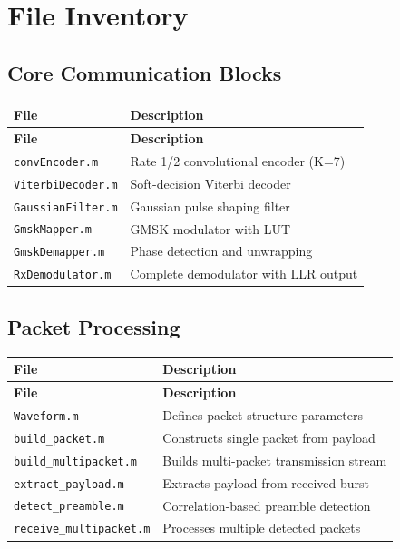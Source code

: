 \documentclass[12pt]{article}
\begin{document}
\section{File Inventory}

\subsection{Core Communication Blocks}
\begin{longtable}{|p{4cm}|p{10cm}|}
\hline
\textbf{File} & \textbf{Description} \\
\hline
\endfirsthead
\hline
\textbf{File} & \textbf{Description} \\
\hline
\endhead
\hline
\endfoot
\hline
\texttt{convEncoder.m} & Rate 1/2 convolutional encoder (K=7) \\
\hline
\texttt{ViterbiDecoder.m} & Soft-decision Viterbi decoder \\
\hline
\texttt{GaussianFilter.m} & Gaussian pulse shaping filter \\
\hline
\texttt{GmskMapper.m} & GMSK modulator with LUT \\
\hline
\texttt{GmskDemapper.m} & Phase detection and unwrapping \\
\hline
\texttt{RxDemodulator.m} & Complete demodulator with LLR output \\
\hline
\end{longtable}

\subsection{Packet Processing}
\begin{longtable}{|p{4cm}|p{10cm}|}
\hline
\textbf{File} & \textbf{Description} \\
\hline
\endfirsthead
\hline
\textbf{File} & \textbf{Description} \\
\hline
\endhead
\hline
\endfoot
\hline
\texttt{Waveform.m} & Defines packet structure parameters \\
\hline
\texttt{build\_packet.m} & Constructs single packet from payload \\
\hline
\texttt{build\_multipacket.m} & Builds multi-packet transmission stream \\
\hline
\texttt{extract\_payload.m} & Extracts payload from received burst \\
\hline
\texttt{detect\_preamble.m} & Correlation-based preamble detection \\
\hline
\texttt{receive\_multipacket.m} & Processes multiple detected packets \\
\hline
\end{longtable}
\end{document}
